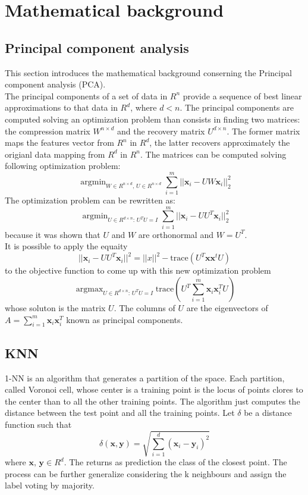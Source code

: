 \documentclass{article}
\DeclareMathOperator*{\argmax}{argmax}
\DeclareMathOperator*{\argmin}{argmin}
\begin{document}
\section{Mathematical background}
\subsection{Principal component analysis}
This section introduces the mathematical background conserning the Principal component analysis (PCA).\\
The principal components of a set of data in $R^n$ provide a sequence of best linear approximations to that data in $R^d$, where $d < n$.
The principal components are computed solving an optimization problem than consists in finding two matrices: the compression matrix $W^{n \times d}$ and  the recovery matrix $U^{d \times n}$. The former matrix maps the features vector from $R^n$ in $R^d$, the latter recovers approximately the origianl data mapping from $R^d$ in $R^n$.
The matrices can be computed solving following optimization problem:
\begin{equation}
\argmin_{W \in R^{n \times d}  , \, U \in R^{n \times d}} \sum_{i = 1}^m ||\textbf{x}_i -UW \textbf{x}_i ||_2^2
\end{equation}
The optimization problem can be rewritten as:
\begin{equation}
\argmin_{U \in R^{d \times n}: \, U^TU=I} \sum_{i = 1}^m ||\textbf{x}_i -UU^T \textbf{x}_i ||_2^2
\end{equation}
because it was shown that $U$ and $W$ are orthonormal and $W = U^T$. \\
It is possible to apply the equaity
\begin{equation}
||\textbf{x}_i -UU^T \textbf{x}_i ||^2 = ||x||^2 - \text{trace}(U^T\textbf{x}\textbf{x}^tU)
\end{equation}
to the objective function to come up with this new optimization problem
\begin{equation}
\argmax_{U \in R^{d \times n}: \, U^TU=I} \text{trace} (U^T\sum_{i=1}^m\textbf{x}_i\textbf{x}_i^T U)
\end{equation}
whose soluton is the matrix $U$. The columns of $U$ are the eigenvectors of $A = \sum_{i=1}^m\textbf{x}_i\textbf{x}_i^T$ known as principal components.

\subsection{KNN}
1-NN is an algorithm that generates a partition of the space. Each partition, called Voronoi cell, whose center is a training point is the locus of points clores to the center than to all the other training points. The algorithm just computes the distance between the test point and all the training points.
Let $\delta$ be a distance function such that 
\begin{equation}
\delta(\textbf{x},\textbf{y}) = \sqrt{\sum_{i=1}^d(\textbf{x}_i-\textbf{y}_i)^2}
\end{equation}
where $\textbf{x}, \, \textbf{y} \in R^d$.
The returns as prediction the class of the closest point. The process can be further generalize considering the k neighbours and assign the label voting by majority.
\end{document}
